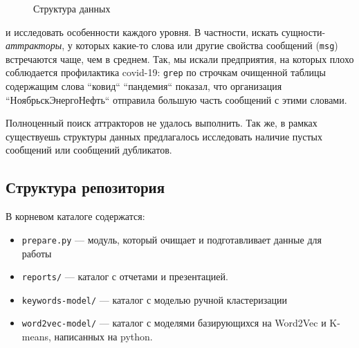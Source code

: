 \documentclass{article}
\begin{document}
\begin{figure}[h!]
    \centering
    \caption{Структура данных}
    \label{fig:structure}
\end{figure}

и исследовать особенности каждого уровня. В частности, искать сущности-\textit{аттракторы}, у которых какие-то слова или другие свойства сообщений (\texttt{msg}) встречаются чаще, чем в среднем. Так, мы искали предприятия, на которых плохо соблюдается профилактика covid-19: \texttt{grep} по строчкам очищенной таблицы содержащим слова ``ковид`` ``пандемия`` показал, что организация ``НоябрьскЭнергоНефть`` отправила большую часть сообщений с этими словами.

Полноценный поиск аттракторов не удалось выполнить. Так же, в рамках существуешь структуры данных предлагалось исследовать наличие пустых сообщений или сообщений дубликатов.

\subsection{Структура репозитория}
В корневом каталоге содержатся:
\begin{itemize}
    \item \texttt{prepare.py} --- модуль, который очищает и подготавливает данные для работы
    \item \texttt{reports/} --- каталог с отчетами и презентацией.
    \item \texttt{keywords-model/} --- каталог с моделью ручной кластеризации
    \item \texttt{word2vec-model/} --- каталог с моделями базирующихся на Word2Vec и K-means, написанных на python.
\end{itemize}
\end{document}
